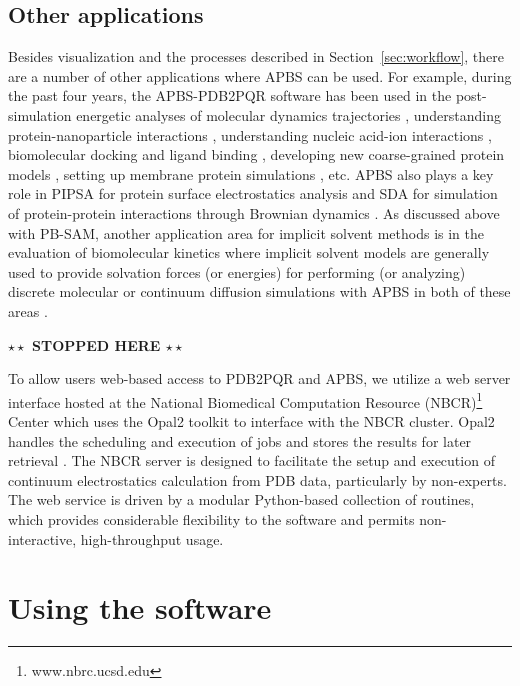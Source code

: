 \documentclass[11pt,titlepage]{article}
\newcommand{\todo}[1]{\textbf{$\star \star$ {#1} $\star \star$}}
\begin{document}
\subsection{Other applications}
Besides visualization and the processes described in Section~\ref{sec:workflow}, there are a number of other applications where APBS can be used.
For example, during the past four years, the APBS-PDB2PQR software has been used in the post-simulation energetic analyses of molecular dynamics trajectories \cite{Dror2013}, understanding protein-nanoparticle interactions \cite{Treuel2013, Nienhaus2013, Depaoli2014}, understanding nucleic acid-ion interactions \cite{Lipfert2014, Giambasu2014}, biomolecular docking \cite{Roberts2013} and ligand binding \cite{Evangelidis2012}, developing new coarse-grained protein models \cite{Spiga2013}, setting up membrane protein simulations \cite{Stansfeld2015}, etc.
APBS also plays a key role in  PIPSA for protein surface electrostatics analysis \cite{richter2008} and SDA for simulation of protein-protein interactions through Brownian dynamics \cite{martinez2015}.
As discussed above with PB-SAM, another application area for implicit solvent methods is in the evaluation of biomolecular kinetics where implicit solvent models are generally used to provide solvation forces (or energies) for performing (or analyzing) discrete molecular or continuum diffusion simulations with APBS in both of these areas \cite{Dror2013, Martinez2015, Chen2007, Song2004a, Song2004b, Elcock2004, Mereghetti2012}.

\todo{STOPPED HERE}


To allow users web-based access to PDB2PQR and APBS, we utilize  a web server interface hosted at the National Biomedical Computation Resource (NBCR)\footnote{www.nbrc.ucsd.edu} Center which uses the Opal2 toolkit to interface with the NBCR cluster. Opal2 handles the scheduling and execution of jobs and stores the results for later retrieval  \cite{krishnan2009}.  The NBCR server is designed to facilitate the setup and execution of continuum electrostatics calculation from PDB data, particularly by non-experts. The web service is driven by a modular Python-based collection of routines, which provides considerable flexibility to the software and permits non-interactive, high-throughput usage. 


\section{Using the software}
\end{document}
